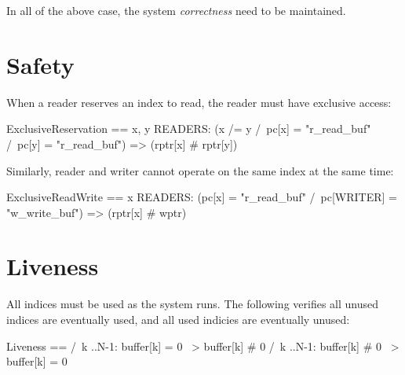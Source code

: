 In all of the above case, the system \textit{correctness} need to be maintained.

\section{Safety}

When a reader reserves an index to read, the reader must have exclusive access: \newline

\begin{tla}
ExclusiveReservation == 
    \A x, y \in READERS: 
        (x /= y /\ pc[x] = "r_read_buf" /\ pc[y] = "r_read_buf") => (rptr[x] # rptr[y])
\end{tla}
\begin{tlatex}
%
%
\end{tlatex}
\newline

Similarly, reader and writer cannot operate on the same index at the same time:\newline
\begin{tla}
ExclusiveReadWrite == 
    \A x \in READERS: 
        (pc[x] = "r_read_buf" /\ pc[WRITER] = "w_write_buf") => (rptr[x] # wptr)
\end{tla}
\begin{tlatex}
%
%
\end{tlatex}

\section{Liveness}

All indices must be used as the system runs. The following verifies all unused
indices are eventually used, and all used indicies are eventually unused:
\newline
\begin{tla}
Liveness ==
    /\ \A k ..N-1:
        buffer[k] = 0 ~> buffer[k] # 0
    /\ \A k ..N-1:
        buffer[k] # 0 ~> buffer[k] = 0
\end{tla}
\begin{tlatex}
%
%
%
%
%
\end{tlatex}
\newline

